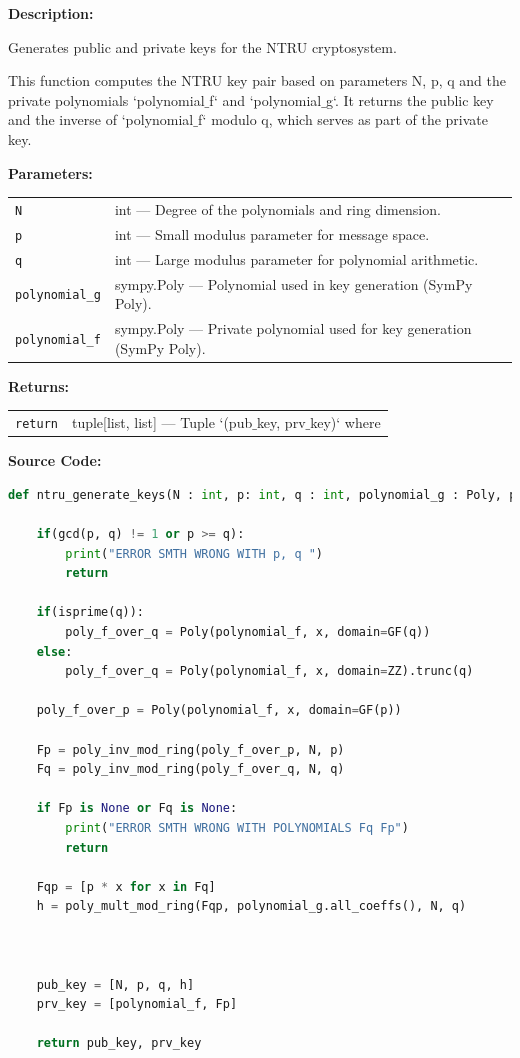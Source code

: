 \documentclass[a4paper,12pt]{article}
\begin{document}
\textbf{Description:}

Generates public and private keys for the NTRU cryptosystem.

This function computes the NTRU key pair based on parameters N, p, q and the
private polynomials `polynomial$\_$f` and `polynomial$\_$g`. It returns the public key
and the inverse of `polynomial$\_$f` modulo q, which serves as part of the private key.

\vspace{1em}
\textbf{Parameters:}

\vspace{1em}
\noindent
\begin{tabular}{p{3cm} p{11cm}}
\texttt{N} & int — Degree of the polynomials and ring dimension. \\
\texttt{p} & int — Small modulus parameter for message space. \\
\texttt{q} & int — Large modulus parameter for polynomial arithmetic. \\
\texttt{polynomial\_g} & sympy.Poly — Polynomial used in key generation (SymPy Poly). \\
\texttt{polynomial\_f} & sympy.Poly — Private polynomial used for key generation (SymPy Poly). \\
\end{tabular}

\vspace{1em}
\noindent
\textbf{Returns:}

\begin{tabular}{p{3cm} p{11cm}}
\texttt{return} & tuple[list, list] — Tuple `(pub$\_$key, prv$\_$key)` where \\
\end{tabular}

\vspace{1em}
\textbf{Source Code:}

\begin{lstlisting}[language=Python]
def ntru_generate_keys(N : int, p: int, q : int, polynomial_g : Poly, polynomial_f : Poly):

    if(gcd(p, q) != 1 or p >= q):
        print("ERROR SMTH WRONG WITH p, q ")
        return

    if(isprime(q)):
        poly_f_over_q = Poly(polynomial_f, x, domain=GF(q))
    else:
        poly_f_over_q = Poly(polynomial_f, x, domain=ZZ).trunc(q)

    poly_f_over_p = Poly(polynomial_f, x, domain=GF(p))

    Fp = poly_inv_mod_ring(poly_f_over_p, N, p)
    Fq = poly_inv_mod_ring(poly_f_over_q, N, q)

    if Fp is None or Fq is None:
        print("ERROR SMTH WRONG WITH POLYNOMIALS Fq Fp")
        return

    Fqp = [p * x for x in Fq]
    h = poly_mult_mod_ring(Fqp, polynomial_g.all_coeffs(), N, q)



    pub_key = [N, p, q, h]
    prv_key = [polynomial_f, Fp]

    return pub_key, prv_key
\end{lstlisting}
\end{document}
